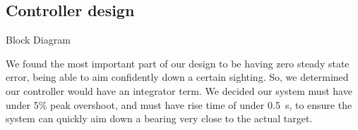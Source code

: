 ﻿\subsection{Controller design}

Block Diagram

We found the most important part of our design to be having zero steady state error, being able to aim confidently down a certain sighting. So, we determined our controller would have an integrator term. We decided our system must have under 5\% peak overshoot, and must have rise time of under \SI{0.5}{\second}, to ensure the system can quickly aim down a bearing very close to the actual target.

